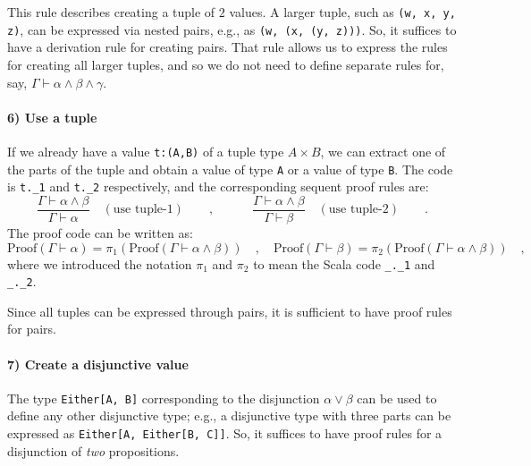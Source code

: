 This rule describes creating a tuple of $2$ values. A larger tuple,
such as \lstinline!(w, x, y, z)!, can be expressed via nested pairs,
e.g., as \lstinline!(w, (x, (y, z)))!. So, it suffices to have a
derivation rule for creating pairs. That rule allows us to express
the rules for creating all larger tuples, and so we do not need to
define separate rules for, say, $\Gamma\vdash\alpha\wedge\beta\wedge\gamma$.

\paragraph{6) Use a tuple}

If we already have a value \lstinline!t:(A,B)! of a tuple type $A\times B$,
we can extract one of the parts of the tuple and obtain a value of
type \lstinline!A! or a value of type \lstinline!B!. The code is
\lstinline!t._1! and \lstinline!t._2! respectively, and the corresponding
sequent proof rules are:
\[
\frac{\Gamma\vdash\alpha\wedge\beta}{\Gamma\vdash\alpha}\quad(\text{use tuple-}1)\quad\quad,\quad\quad\quad\frac{\Gamma\vdash\alpha\wedge\beta}{\Gamma\vdash\beta}\quad(\text{use tuple-}2)\quad\quad.
\]
The proof code can be written as:
\[
\text{Proof}\left(\Gamma\vdash\alpha\right)=\pi_{1}\left(\text{Proof}\left(\Gamma\vdash\alpha\wedge\beta\right)\right)\quad,\quad\text{Proof}\left(\Gamma\vdash\beta\right)=\pi_{2}\left(\text{Proof}\left(\Gamma\vdash\alpha\wedge\beta\right)\right)\quad,
\]
where we introduced the notation $\pi_{1}$ and $\pi_{2}$ to mean
the Scala code \lstinline!_._1! and \lstinline!_._2!.

Since all tuples can be expressed through pairs, it is sufficient
to have proof rules for pairs.

\paragraph{7) Create a disjunctive value}

The type \lstinline!Either[A, B]! corresponding to the disjunction
$\alpha\vee\beta$ can be used to define any other disjunctive type;
e.g., a disjunctive type with three parts can be expressed as \lstinline!Either[A, Either[B, C]]!.
So, it suffices to have proof rules for a disjunction of \emph{two}
propositions.

